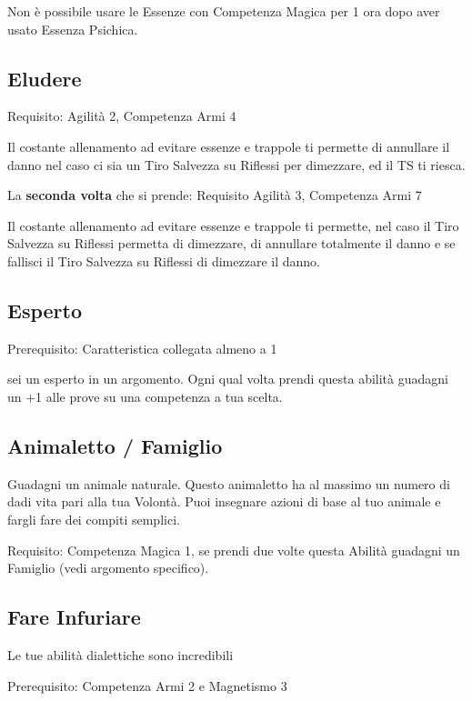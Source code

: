 \documentclass[a4paper,11pt,twoside,openany]{book}
\begin{document}
Non è possibile usare le Essenze con Competenza Magica per 1 ora dopo aver usato Essenza Psichica.

\subsection{Eludere}

Requisito: Agilità 2, Competenza Armi 4

Il costante allenamento ad evitare essenze e trappole ti permette di annullare il danno nel caso ci sia un Tiro Salvezza su Riflessi per dimezzare, ed il TS ti riesca.


La \textbf{seconda volta} che si prende: Requisito Agilità 3, Competenza Armi 7

Il costante allenamento ad evitare essenze e trappole ti permette, nel caso il Tiro Salvezza su Riflessi permetta di dimezzare, di annullare totalmente il danno e se fallisci il Tiro Salvezza su Riflessi di dimezzare il danno.

\subsection{Esperto}

Prerequisito: Caratteristica collegata almeno a 1

sei un esperto in un argomento. Ogni qual volta prendi questa abilità guadagni un +1 alle prove su una competenza a tua scelta.

\subsection{Animaletto / Famiglio}

Guadagni un animale naturale. Questo animaletto ha al massimo un numero di dadi vita pari alla tua Volontà. Puoi insegnare azioni di base al tuo animale e fargli fare dei compiti semplici.

Requisito: Competenza Magica 1, se prendi due volte questa Abilità guadagni un Famiglio (vedi argomento specifico).

\subsection{Fare Infuriare}

Le tue abilità dialettiche sono incredibili

Prerequisito: Competenza Armi 2 e Magnetismo 3
\end{document}
